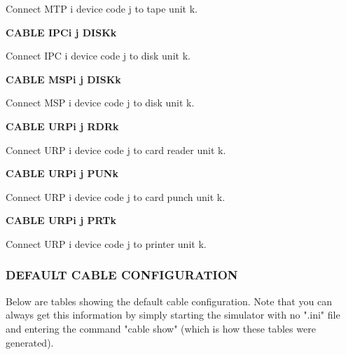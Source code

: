 \begin{adjustwidth}{5ex}{1ex}
  Connect MTP i device code j to tape unit k.
\end{adjustwidth}

\textbf{CABLE IPCi j DISKk}

\begin{adjustwidth}{5ex}{1ex}
  Connect IPC i device code j to disk unit k.
\end{adjustwidth}

\textbf{CABLE MSPi j DISKk}

\begin{adjustwidth}{5ex}{1ex}
  Connect MSP i device code j to disk unit k.
\end{adjustwidth}

\textbf{CABLE URPi j RDRk}

\begin{adjustwidth}{5ex}{1ex}
  Connect URP i device code j to card reader unit k.
\end{adjustwidth}

\textbf{CABLE URPi j PUNk}

\begin{adjustwidth}{5ex}{1ex}
  Connect URP i device code j to card punch unit k.
\end{adjustwidth}

\textbf{CABLE URPi j PRTk}

\begin{adjustwidth}{5ex}{1ex}
  Connect URP i device code j to printer unit k.
\end{adjustwidth}

\subsubsection[Default Cable Configuration]{DEFAULT CABLE CONFIGURATION}

Below are tables showing the default cable configuration. Note that you
can always get this information by simply starting the simulator with
no ".ini" file and entering the command "cable show" (which is how these tables were generated).

